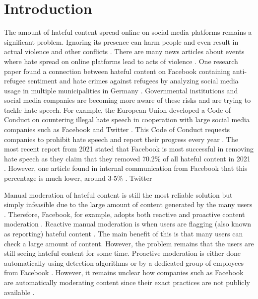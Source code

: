 \chapter{Introduction}
\newcommand{\customtextbox}[1]{
	\setlength{\fboxsep}{0.5em}
	\fbox{
		\begin{minipage}{\linewidth-1.7em}
			\vspace*{0.25em}
			#1
		\end{minipage}
	}
}

The amount of hateful content spread online on social media platforms remains a significant problem. Ignoring its presence can harm people and even result in actual violence and other conflicts \cite{ecri-hate-speech-and-violence, balayn2021automatic}. There are many news articles about events where hate spread on online platforms lead to acts of violence \cite{columbia-facebook-linked-to-violence, mujib-mashal-india, paul-mozur-2018, muller2021fanning}. One research paper found a connection between hateful content on Facebook containing anti-refugee sentiment and hate crimes against refugees by analyzing social media usage in multiple municipalities in Germany  \cite{muller2021fanning}. Governmental institutions and social media companies are becoming more aware of these risks and are trying to tackle hate speech. For example, the European Union developed a Code of Conduct on countering illegal hate speech in cooperation with large social media companies such as Facebook and Twitter \cite{eu-code-of-conduct}. This Code of Conduct requests companies to prohibit hate speech and report their progress every year \cite{eu-code-of-conduct}. The most recent report from 2021 stated that Facebook is most successful in removing hate speech as they claim that they removed 70.2\% of all hateful content in 2021 \cite{eu-code-of-conduct}. However, one article found in internal communication from Facebook that this percentage is much lower, around 3-5\% \cite{noah2021giansiracusa}. Twitter

Manual moderation of hateful content is still the most reliable solution but simply infeasible due to the large amount of content generated by the many users \cite{balayn2021automatic}. Therefore, Facebook, for example, adopts both reactive and proactive content moderation \cite{klonick2017new}. Reactive manual moderation is when users are flagging (also known as reporting) hateful content \cite{klonick2017new}. The main benefit of this is that many users can check a large amount of content. However, the problem remains that the users are still seeing hateful content for some time. Proactive moderation is either done automatically using detection algorithms or by a dedicated group of employees from Facebook \cite{klonick2017new}. However, it remains unclear how companies such as Facebook are automatically moderating content since their exact practices are not publicly available \cite{klonick2017new}. 


